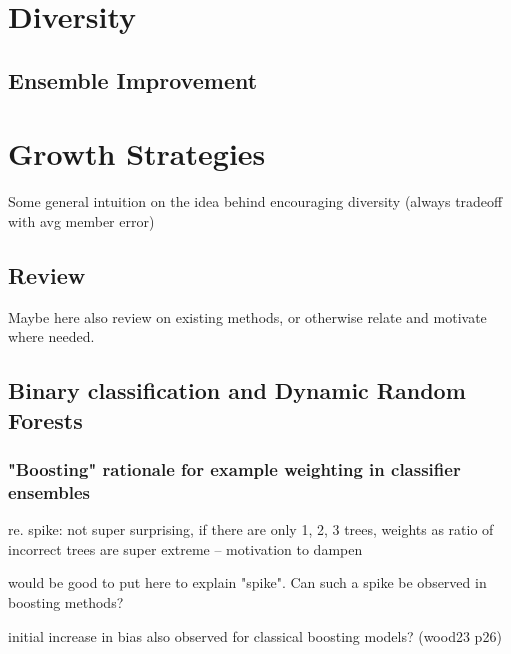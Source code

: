 \documentclass[
    a4paper, %
	fontsize=10pt, %
	twoside=false, %
]{kaobook}
\begin{document}
\chapter{Diversity}







\section{Ensemble Improvement}


\chapter{Growth Strategies}

Some general intuition on the idea behind encouraging diversity (always tradeoff with avg member error)

\section{Review} 
Maybe here also review on existing methods, or otherwise relate and motivate where needed.


\section{Binary classification and Dynamic Random Forests}


\subsection{"Boosting" rationale for example weighting in classifier ensembles}

re. spike: not super surprising, if there are only 1, 2, 3 trees, weights as ratio of incorrect trees are super extreme -- motivation to dampen

would be good to put here to explain "spike". Can such a spike be observed in boosting methods?

initial increase in bias also observed for classical boosting models? (wood23 p26)

\end{document}
